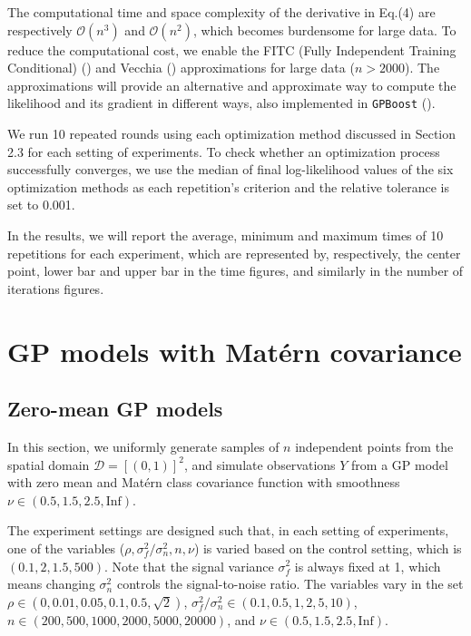 The computational time and space complexity of the derivative in Eq.(4) are respectively $\mathcal{O}(n^3)$ and $\mathcal{O}(n^2)$, which becomes burdensome for large data. To reduce the computational cost, we enable the FITC (Fully Independent Training Conditional) (\cite{quinonero2005unifying}) and Vecchia (\cite{nesterov2004introductory}) approximations for large data ($n>2000$). The approximations will provide an alternative and approximate way to compute the likelihood and its gradient in different ways, also implemented in \texttt{GPBoost} (\cite{sigrist2022gaussian}).

We run 10 repeated rounds using each optimization method discussed in Section 2.3 for each setting of experiments. To check whether an optimization process successfully converges, we use the median of final log-likelihood values of the six optimization methods as each repetition's criterion and the relative tolerance is set to 0.001. 

In the results, we will report the average, minimum and maximum times of 10 repetitions for each experiment, which are represented by, respectively, the center point, lower bar and upper bar in the time figures, and similarly in the number of iterations figures.


\section{GP models with Mat\'ern covariance}
\subsection{Zero-mean GP models}

In this section, we uniformly generate samples of $n$ independent points from the spatial domain $\mathcal{D} = [(0, 1)]^2$, and simulate observations $Y$ from a GP model with zero mean and Mat\'ern class covariance function with smoothness $\nu \in (0.5, 1.5, 2.5, \text{Inf})$.

The experiment settings are designed such that, in each setting of experiments, one of the variables ($\rho, \sigma^2_f/\sigma^2_n, n, \nu$) is varied based on the control setting, which is $(0.1, 2, 1.5, 500)$. Note that the signal variance $\sigma^2_f$ is always fixed at 1, which means changing $\sigma^2_n$ controls the signal-to-noise ratio. The variables vary in the set $\rho \in (0, 0.01, 0.05, 0.1, 0.5, \sqrt{2})$, $\sigma^2_f/\sigma^2_n \in (0.1, 0.5, 1, 2, 5, 10)$, $n \in (200, 500, 1000, 2000, 5000, 20000)$, and $\nu \in (0.5, 1.5, 2.5, \text{Inf})$.

